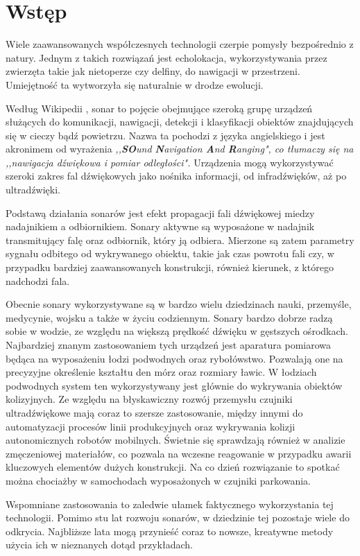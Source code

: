 \chapter{Wstęp}
\label{wstep}



Wiele zaawansowanych współczesnych technologii czerpie pomysły bezpośrednio z natury. Jednym z takich rozwiązań jest echolokacja, 
wykorzystywania przez zwierzęta takie jak nietoperze czy delfiny, do nawigacji w przestrzeni. 
Umiejętność ta wytworzyła się naturalnie w drodze ewolucji.

Według Wikipedii \cite{sonar},
sonar to pojęcie obejmujące szeroką grupę urządzeń służących do komunikacji, nawigacji, detekcji i klasyfikacji obiektów znajdujących się w cieczy bądź powietrzu.
Nazwa ta pochodzi z języka angielskiego i jest akronimem od wyrażenia {\em ,,\textbf{SO}und \textbf{N}avigation \textbf{A}nd \textbf{R}anging", 
co tłumaczy się na ,,nawigacja dźwiękowa i pomiar odległości".}
Urządzenia mogą wykorzystywać szeroki zakres fal dźwiękowych jako nośnika informacji, od infradźwięków, aż po ultradźwięki.

Podstawą działania sonarów jest efekt propagacji fali dźwiękowej miedzy nadajnikiem a odbiornikiem. 
Sonary aktywne są wyposażone w nadajnik transmitujący falę oraz odbiornik, który ją odbiera. 
Mierzone są zatem parametry sygnału odbitego od wykrywanego obiektu, takie jak czas powrotu fali 
czy, w przypadku bardziej zaawansowanych konstrukcji, również kierunek, z którego nadchodzi fala.

Obecnie sonary wykorzystywane są w bardzo wielu dziedzinach nauki, przemyśle, medycynie, wojsku a także w życiu codziennym. 
Sonary bardzo dobrze radzą sobie w wodzie, ze względu na większą prędkość dźwięku w gęstszych ośrodkach. 
Najbardziej znanym zastosowaniem tych urządzeń jest aparatura pomiarowa będąca na wyposażeniu łodzi podwodnych oraz rybołówstwo. 
Pozwalają one na precyzyjne określenie kształtu den mórz oraz rozmiary ławic. W łodziach podwodnych system ten wykorzystywany jest głównie do wykrywania obiektów kolizyjnych.
Ze względu na błyskawiczny rozwój przemysłu czujniki ultradźwiękowe mają coraz to szersze zastosowanie, 
między innymi do automatyzacji procesów linii produkcyjnych oraz wykrywania kolizji autonomicznych robotów mobilnych. 
Świetnie się sprawdzają również w analizie zmęczeniowej materiałów, co pozwala na wczesne reagowanie w przypadku awarii kluczowych elementów dużych konstrukcji.
Na co dzień rozwiązanie to spotkać można chociażby w samochodach wyposażonych w czujniki parkowania.

Wspomniane zastosowania to zaledwie ułamek faktycznego wykorzystania tej technologii. 
Pomimo stu lat rozwoju sonarów, w dziedzinie tej pozostaje wiele do odkrycia. 
Najbliższe lata mogą przynieść coraz to nowsze, kreatywne metody użycia ich w nieznanych dotąd przykładach.

\nocite{sonar}